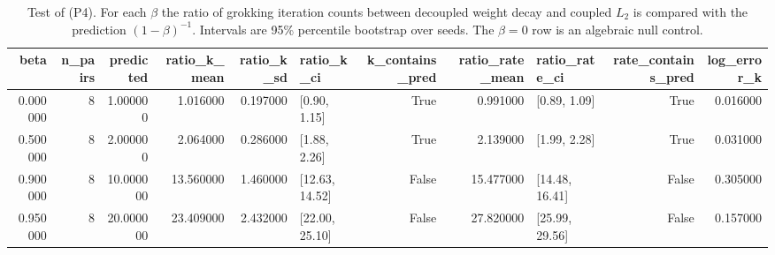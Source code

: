 \begin{table}
\caption{Test of (P4). For each $\beta$ the ratio of grokking iteration counts between decoupled weight decay and coupled $L_2$ is compared with the prediction $(1-\beta)^{-1}$. Intervals are 95\% percentile bootstrap over seeds. The $\beta=0$ row is an algebraic null control.}
\label{tab:p4}
\begin{tabular}{rrrrrlrrlrr}
\toprule
beta & n_pairs & predicted & ratio_k_mean & ratio_k_sd & ratio_k_ci & k_contains_pred & ratio_rate_mean & ratio_rate_ci & rate_contains_pred & log_error_k \\
\midrule
0.000000 & 8 & 1.000000 & 1.016000 & 0.197000 & [0.90, 1.15] & True & 0.991000 & [0.89, 1.09] & True & 0.016000 \\
0.500000 & 8 & 2.000000 & 2.064000 & 0.286000 & [1.88, 2.26] & True & 2.139000 & [1.99, 2.28] & True & 0.031000 \\
0.900000 & 8 & 10.000000 & 13.560000 & 1.460000 & [12.63, 14.52] & False & 15.477000 & [14.48, 16.41] & False & 0.305000 \\
0.950000 & 8 & 20.000000 & 23.409000 & 2.432000 & [22.00, 25.10] & False & 27.820000 & [25.99, 29.56] & False & 0.157000 \\
\bottomrule
\end{tabular}
\end{table}
